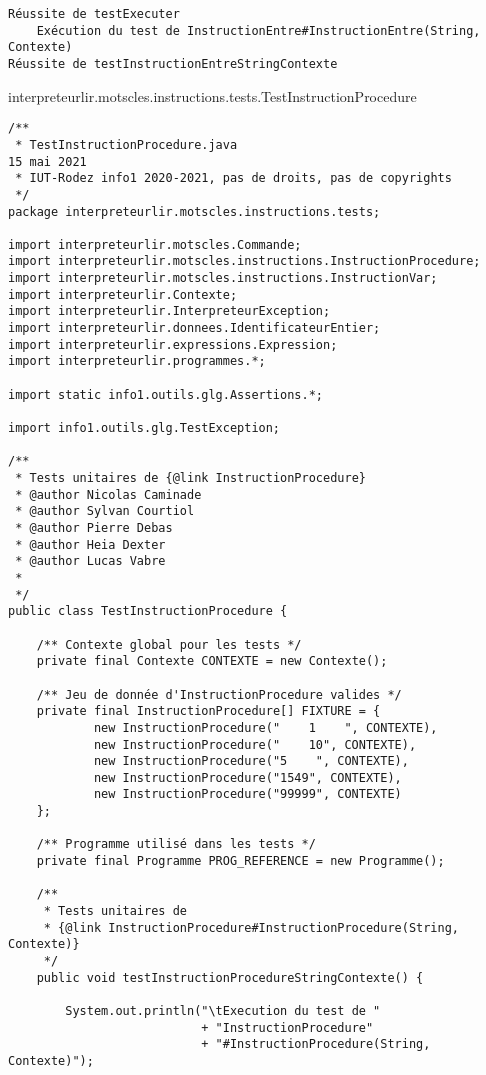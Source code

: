 \begin{enum}
\begin{verbatim}
Réussite de testExecuter
    Exécution du test de InstructionEntre#InstructionEntre(String, Contexte)
Réussite de testInstructionEntreStringContexte
\end{verbatim}


    \item interpreteurlir.motscles.instructions.tests.TestInstructionProcedure
\begin{verbatim}
/**
 * TestInstructionProcedure.java                                        15 mai 2021
 * IUT-Rodez info1 2020-2021, pas de droits, pas de copyrights
 */
package interpreteurlir.motscles.instructions.tests;

import interpreteurlir.motscles.Commande;
import interpreteurlir.motscles.instructions.InstructionProcedure;
import interpreteurlir.motscles.instructions.InstructionVar;
import interpreteurlir.Contexte;
import interpreteurlir.InterpreteurException;
import interpreteurlir.donnees.IdentificateurEntier;
import interpreteurlir.expressions.Expression;
import interpreteurlir.programmes.*;

import static info1.outils.glg.Assertions.*;

import info1.outils.glg.TestException;

/**
 * Tests unitaires de {@link InstructionProcedure}
 * @author Nicolas Caminade
 * @author Sylvan Courtiol
 * @author Pierre Debas
 * @author Heia Dexter
 * @author Lucas Vabre
 *
 */
public class TestInstructionProcedure {
    
    /** Contexte global pour les tests */
    private final Contexte CONTEXTE = new Contexte();
    
    /** Jeu de donnée d'InstructionProcedure valides */
    private final InstructionProcedure[] FIXTURE = {
            new InstructionProcedure("    1    ", CONTEXTE),
            new InstructionProcedure("    10", CONTEXTE),
            new InstructionProcedure("5    ", CONTEXTE),
            new InstructionProcedure("1549", CONTEXTE),
            new InstructionProcedure("99999", CONTEXTE)
    };
    
    /** Programme utilisé dans les tests */
    private final Programme PROG_REFERENCE = new Programme(); 
    
    /**
     * Tests unitaires de
     * {@link InstructionProcedure#InstructionProcedure(String, Contexte)}
     */
    public void testInstructionProcedureStringContexte() {
        
        System.out.println("\tExecution du test de "
                           + "InstructionProcedure"
                           + "#InstructionProcedure(String, Contexte)");
        

\end{verbatim}
\end{enum}
